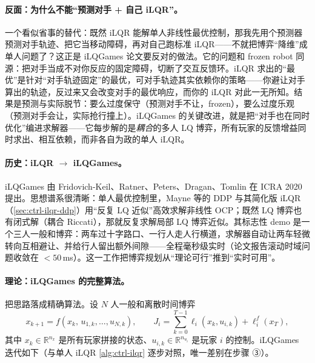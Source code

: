\paragraph{反面：为什么不能“预测对手 + 自己 iLQR”。}
一个看似省事的替代：既然 iLQR 能解单人非线性最优控制，那我先用个预测器预测对手轨迹、把它当移动障碍，再对自己跑标准 iLQR——不就把博弈“降维”成单人问题了？这正是 iLQGames 论文要反对的做法\cite{fridovich2020efficient}。它的问题和 frozen robot 同源：把对手当成不对你反应的固定障碍，切断了交互反馈环。iLQR 求出的“最优”是针对“对手轨迹固定”的最优，可对手轨迹其实依赖你的策略——你避让对手算出的轨迹，反过来又会改变对手的最优响应，而你的 iLQR 对此一无所知。结果是预测与实际脱节：要么过度保守（预测对手不让，frozen），要么过度乐观（预测对手会让，实际抢行撞上）。iLQGames 的关键改进，就是把“对手也在同时优化”编进求解器——它每步解的是\emph{耦合}的多人 LQ 博弈，所有玩家的反馈增益同时求出、相互依赖，而非各自为政的单人 iLQR。

\paragraph{历史：iLQR $\to$ iLQGames。}
iLQGames 由 Fridovich-Keil、Ratner、Peters、Dragan、Tomlin 在 ICRA 2020 提出\cite{fridovich2020efficient}。思想谱系很清晰：单人最优控制里，Mayne 等的 DDP 与其简化版 iLQR（\cref{sec:ctrl-ilqr-ddp}）用“反复 LQ 近似”高效求解非线性 OCP；既然 LQ 博弈也有闭式解（耦合 Riccati），那就反复求解局部 LQ 博弈近似。其标志性 demo 是一个三人一般和博弈：两车过十字路口、一行人走人行横道，求解器自动让两车轻微转向互相避让、并给行人留出额外间隙——全程毫秒级实时（论文报告滚动时域问题收敛在 $<50$\,ms）\cite{fridovich2020efficient}。这一工作把博弈规划从“理论可行”推到“实时可用”。

\paragraph{理论：iLQGames 的完整算法。}
把思路落成精确算法。设 $N$ 人一般和离散时间博弈
\begin{equation}
  x_{k+1}=f(x_k,\,u_{1,k},\dots,u_{N,k}),\qquad
  J_i=\sum_{k=0}^{T-1}\ell_i(x_k,u_{i,k})+\ell_i^f(x_T),
  \label{eq:rtg-ilqgames-problem}
\end{equation}
其中 $x_k\in\mathbb{R}^{n_x}$ 是所有玩家拼接的状态、$u_{i,k}\in\mathbb{R}^{n_{u_i}}$ 是玩家 $i$ 的控制。iLQGames 迭代如下（与单人 iLQR \cref{alg:ctrl-ilqr} 逐步对照，唯一差别在步骤 ③）。

